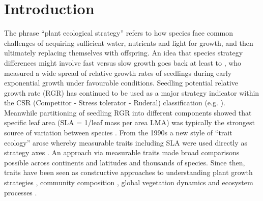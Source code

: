 \documentclass[a4paper,11pt]{article}
\begin{document}
\section*{Introduction}\label{introduction}

The phrase ``plant ecological strategy'' refers to how species face common challenges of acquiring sufficient water, nutrients and light for growth, and then ultimately replacing themselves with offspring. An idea that species strategy differences might involve fast versus slow growth goes back at least to \citet{Grime:1975gr}, who measured a wide spread of relative growth rates of seedlings during early exponential growth under favourable conditions. Seedling potential relative growth rate (RGR) has continued to be used as a major strategy indicator within the CSR (Competitor - Stress tolerator - Ruderal) classification (e.g. \citealt{grime1979plant, Grime:1997wm}). Meanwhile partitioning of seedling RGR into different components showed that specific leaf area (SLA = 1/leaf mass per area LMA) was typically the strongest source of variation between species \citep{Poorter:1989tx, Rees:2010gk}. From the 1990s a new style of ``trait ecology'' arose whereby measurable traits including SLA were used directly as strategy axes \citep{Westoby:2002ft}. An approach via measurable traits made broad comparisons possible across continents and latitudes and thousands of species. Since then, traits have been seen as constructive approaches to understanding plant growth strategies \citep{Grime:1977kc,Chapin:1980gz}, community composition \citep{Lavorel:2002ff,Shipley:2006ie}, global vegetation dynamics \citep{Scheiter:2013ed} and ecosystem processes \citep{Lavorel:2002ff}.
\end{document}
